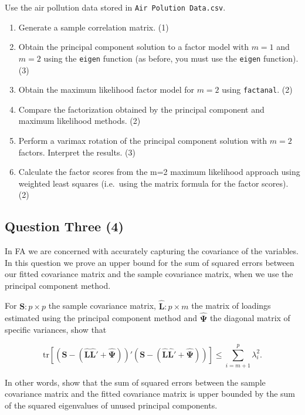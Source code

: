 \documentclass[
  letterpaper,
  DIV=11,
  numbers=noendperiod]{scrartcl}
\providecommand{\tightlist}{%
  \setlength{\itemsep}{0pt}\setlength{\parskip}{0pt}}\usepackage{longtable,booktabs,array}
\begin{document}
Use the air pollution data stored in \texttt{Air\ Polution\ Data.csv}.

\begin{enumerate}
\def\labelenumi{\alph{enumi}.}
\tightlist
\item
  Generate a sample correlation matrix. (1)
\item
  Obtain the principal component solution to a factor model with \(m=1\)
  and \(m=2\) using the \texttt{eigen} function (as before, you must use
  the \texttt{eigen} function). (3)
\item
  Obtain the maximum likelihood factor model for \(m=2\) using
  \texttt{factanal}. (2)
\item
  Compare the factorization obtained by the principal component and
  maximum likelihood methods. (2)
\item
  Perform a varimax rotation of the principal component solution with
  \(m=2\) factors. Interpret the results. (3)
\item
  Calculate the factor scores from the m=2 maximum likelihood approach
  using weighted least squares (i.e.~using the matrix formula for the
  factor scores). (2)
\end{enumerate}

\hypertarget{question-three-4}{%
\subsection{Question Three (4)}\label{question-three-4}}

In FA we are concerned with accurately capturing the covariance of the
variables. In this question we prove an upper bound for the sum of
squared errors between our fitted covariance matrix and the sample
covariance matrix, when we use the principal component method.

For \(\mathbf{S}:p\times p\) the sample covariance matrix,
\(\hat{\mathbf{L}}:p\times m\) the matrix of loadings estimated using
the principal component method and \(\hat{\mathbf{\Psi}}\) the diagonal
matrix of specific variances, show that

\[
\mathrm{tr}[(\mathbf{S}-(\hat{\mathbf{L}}\hat{\mathbf{L}}' + \hat{\mathbf{\Psi}}))'(\mathbf{S}-(\hat{\mathbf{L}}\hat{\mathbf{L}}' + \hat{\mathbf{\Psi}}))]\leq \sum_{i=m+1}^p\lambda_i^2.
\]

In other words, show that the sum of squared errors between the sample
covariance matrix and the fitted covariance matrix is upper bounded by
the sum of the squared eigenvalues of unused principal components.
\end{document}
